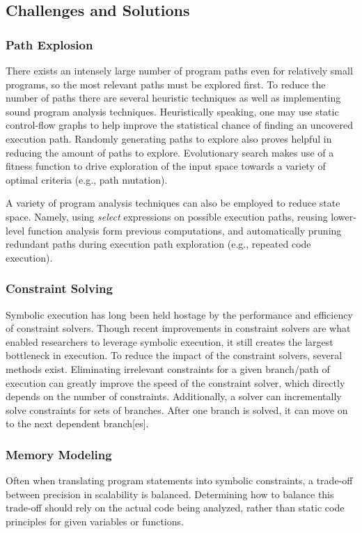 \documentclass[11pt, journal]{IEEEtran}
\begin{document}
\subsection{Challenges and Solutions}
\subsubsection{Path Explosion}
There exists an intensely large number of program paths even for relatively small programs, so the most relevant paths must be explored first. To reduce the number of paths there are several heuristic techniques as well as implementing sound program analysis techniques. Heuristically speaking, one may use static control-flow graphs to help improve the statistical chance of finding an uncovered execution path. Randomly generating paths to explore also proves helpful in reducing the amount of paths to explore. Evolutionary search makes use of a fitness function to drive exploration of the input space towards a variety of optimal criteria (e.g., path mutation). 

A variety of program analysis techniques can also be employed to reduce state space. Namely, using \textit{select} expressions on possible execution paths, reusing lower-level function analysis form previous computations, and automatically pruning redundant paths during execution path exploration (e.g., repeated code execution). 
\subsubsection{Constraint Solving}
Symbolic execution has long been held hostage by the performance and efficiency of constraint solvers. Though recent improvements in constraint solvers are what enabled researchers to leverage symbolic execution, it still creates the largest bottleneck in execution. To reduce the impact of the constraint solvers, several methods exist. Eliminating irrelevant constraints for a given branch/path of execution can greatly improve the speed of the constraint solver, which directly depends on the number of constraints. Additionally, a solver can incrementally solve constraints for sets of branches. After one branch is solved, it can move on to the next dependent branch[es].
\subsubsection{Memory Modeling}
Often when translating program statements into symbolic constraints, a trade-off between precision in scalability is balanced. Determining how to balance this trade-off should rely on the actual code being analyzed, rather than static code principles for given variables or functions.
\end{document}
